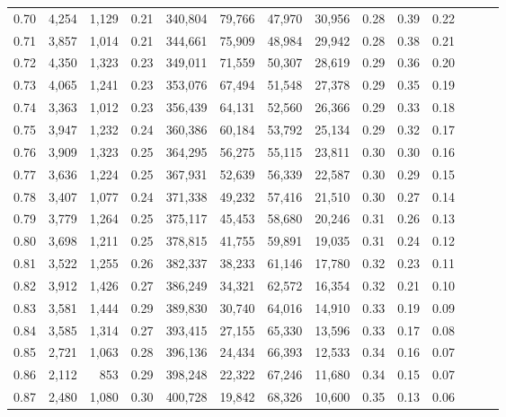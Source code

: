 \begin{tabular}{rrrrrrrrrrrrrr}
0.70 &   4,254 &  1,129 &  0.21 &  340,804 &   79,766 &  47,970 &  30,956 &  0.28 &  0.39 &      0.22 \\
0.71 &   3,857 &  1,014 &  0.21 &  344,661 &   75,909 &  48,984 &  29,942 &  0.28 &  0.38 &      0.21 \\
0.72 &   4,350 &  1,323 &  0.23 &  349,011 &   71,559 &  50,307 &  28,619 &  0.29 &  0.36 &      0.20 \\
0.73 &   4,065 &  1,241 &  0.23 &  353,076 &   67,494 &  51,548 &  27,378 &  0.29 &  0.35 &      0.19 \\
0.74 &   3,363 &  1,012 &  0.23 &  356,439 &   64,131 &  52,560 &  26,366 &  0.29 &  0.33 &      0.18 \\
0.75 &   3,947 &  1,232 &  0.24 &  360,386 &   60,184 &  53,792 &  25,134 &  0.29 &  0.32 &      0.17 \\
0.76 &   3,909 &  1,323 &  0.25 &  364,295 &   56,275 &  55,115 &  23,811 &  0.30 &  0.30 &      0.16 \\
0.77 &   3,636 &  1,224 &  0.25 &  367,931 &   52,639 &  56,339 &  22,587 &  0.30 &  0.29 &      0.15 \\
0.78 &   3,407 &  1,077 &  0.24 &  371,338 &   49,232 &  57,416 &  21,510 &  0.30 &  0.27 &      0.14 \\
0.79 &   3,779 &  1,264 &  0.25 &  375,117 &   45,453 &  58,680 &  20,246 &  0.31 &  0.26 &      0.13 \\
0.80 &   3,698 &  1,211 &  0.25 &  378,815 &   41,755 &  59,891 &  19,035 &  0.31 &  0.24 &      0.12 \\
0.81 &   3,522 &  1,255 &  0.26 &  382,337 &   38,233 &  61,146 &  17,780 &  0.32 &  0.23 &      0.11 \\
0.82 &   3,912 &  1,426 &  0.27 &  386,249 &   34,321 &  62,572 &  16,354 &  0.32 &  0.21 &      0.10 \\
0.83 &   3,581 &  1,444 &  0.29 &  389,830 &   30,740 &  64,016 &  14,910 &  0.33 &  0.19 &      0.09 \\
0.84 &   3,585 &  1,314 &  0.27 &  393,415 &   27,155 &  65,330 &  13,596 &  0.33 &  0.17 &      0.08 \\
0.85 &   2,721 &  1,063 &  0.28 &  396,136 &   24,434 &  66,393 &  12,533 &  0.34 &  0.16 &      0.07 \\
0.86 &   2,112 &    853 &  0.29 &  398,248 &   22,322 &  67,246 &  11,680 &  0.34 &  0.15 &      0.07 \\
0.87 &   2,480 &  1,080 &  0.30 &  400,728 &   19,842 &  68,326 &  10,600 &  0.35 &  0.13 &      0.06 \\

\end{tabular}
